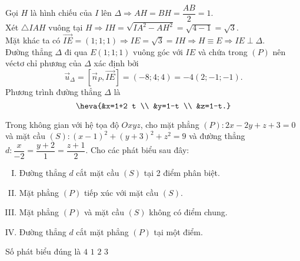 \begin{ex}
{		Gọi $H$ là hình chiếu của $I$ lên $\Delta \Rightarrow A H=B H=\dfrac{A B}{2}=1$.\\
		Xét $\triangle I A H$ vuông tại $H \Rightarrow I H=\sqrt{I A^2-A H^2}=\sqrt{4-1}=\sqrt{3}$.\\
		Mặt khác ta có $\overrightarrow{I E}=(1; 1; 1) \Rightarrow I E=\sqrt{3}=I H \Rightarrow H \equiv E \Rightarrow I E \perp \Delta$.\\
		Đường thẳng $\Delta$ đi qua $E(1; 1; 1)$ vuông góc với $I E$ và chứa trong $(P)$ nên	véctơ chỉ phương của $\Delta$ xác định bởi $$\overrightarrow{u}_{\Delta}=\left[\overrightarrow{n}_P, \overrightarrow{I E}\right]=(-8; 4; 4)=-4(2;-1;-1).$$
		Phương trình đường thẳng $\Delta$ là $$\heva{&x=1+2 t \\ &y=1-t \\ &z=1-t.}$$	
	}
\end{ex}
\begin{ex}%
	Trong không gian với hệ tọa độ $O x y z$, cho mặt phẳng $(P)\colon 2 x-2 y+z+3=0$ và mặt cầu $(S)\colon(x-1)^2+(y+3)^2+z^2=9$ và đường thẳng $d\colon \dfrac{x}{-2}=\dfrac{y+2}{1}=\dfrac{z+1}{2}$. Cho các phát biểu sau đây:
	\begin{enumerate}[I. ]
		\item Đường thẳng $d$ cắt mặt cầu $(S)$ tại 2 điểm phân biệt.
		\item Mặt phẳng $(P)$ tiếp xúc với mặt cầu $(S)$.
		\item Mặt phẳng $(P)$ và mặt cầu $(S)$ không có điểm chung.
		\item Đường thẳng $d$ cắt mặt phẳng $(P)$ tại một điểm.	
	\end{enumerate}
	Số phát biểu đúng là
	\choice
	{$4$}
	{$1$}
	{$2$}
	{\True $3$}
\end{ex} 

